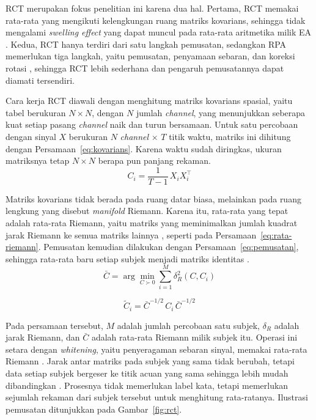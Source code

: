 RCT merupakan fokus penelitian ini karena dua hal.
Pertama, RCT memakai rata-rata yang mengikuti kelengkungan ruang matriks kovarians, sehingga tidak mengalami \textit{swelling effect} yang dapat muncul pada rata-rata aritmetika milik EA \parencite{arsigny2005,zanini2018}.
Kedua, RCT hanya terdiri dari satu langkah pemusatan, sedangkan RPA memerlukan tiga langkah, yaitu pemusatan, penyamaan sebaran, dan koreksi rotasi \parencite{rodrigues2019}, sehingga RCT lebih sederhana dan pengaruh pemusatannya dapat diamati tersendiri.

Cara kerja RCT diawali dengan menghitung matriks kovarians spasial, yaitu tabel berukuran $N \times N$, dengan $N$ jumlah \textit{channel}, yang menunjukkan seberapa kuat setiap pasang \textit{channel} naik dan turun bersamaan.
Untuk satu percobaan dengan sinyal $X$ berukuran $N$ \textit{channel} $\times$ $T$ titik waktu, matriks ini dihitung dengan Persamaan~\ref{eq:kovarians}.
Karena waktu sudah diringkas, ukuran matriksnya tetap $N \times N$ berapa pun panjang rekaman.
\begin{equation}
C_i = \frac{1}{T-1}\, X_i X_i^{\top}
\label{eq:kovarians}
\end{equation}

Matriks kovarians tidak berada pada ruang datar biasa, melainkan pada ruang lengkung yang disebut \textit{manifold} Riemann.
Karena itu, rata-rata yang tepat adalah rata-rata Riemann, yaitu matriks yang meminimalkan jumlah kuadrat jarak Riemann ke semua matriks lainnya \parencite{he2020}, seperti pada Persamaan~\ref{eq:rata-riemann}.
Pemusatan kemudian dilakukan dengan Persamaan~\ref{eq:pemusatan}, sehingga rata-rata baru setiap subjek menjadi matriks identitas \parencite{zanini2018}.
\begin{equation}
\bar{C} = \arg\min_{C \succ 0} \sum_{i=1}^{M} \delta_R^{2}(C, C_i)
\label{eq:rata-riemann}
\end{equation}

\begin{equation}
\tilde{C}_i = \bar{C}^{-1/2}\, C_i\, \bar{C}^{-1/2}
\label{eq:pemusatan}
\end{equation}

Pada persamaan tersebut, $M$ adalah jumlah percobaan satu subjek, $\delta_R$ adalah jarak Riemann, dan $\bar{C}$ adalah rata-rata Riemann milik subjek itu.
Operasi ini setara dengan \textit{whitening}, yaitu penyeragaman sebaran sinyal, memakai rata-rata Riemann \parencite{bleuze2022}.
Jarak antar matriks pada subjek yang sama tidak berubah, tetapi data setiap subjek bergeser ke titik acuan yang sama sehingga lebih mudah dibandingkan \parencite{he2020}.
Prosesnya tidak memerlukan label kata, tetapi memerlukan sejumlah rekaman dari subjek tersebut untuk menghitung rata-ratanya.
Ilustrasi pemusatan ditunjukkan pada Gambar~\ref{fig:rct}.

